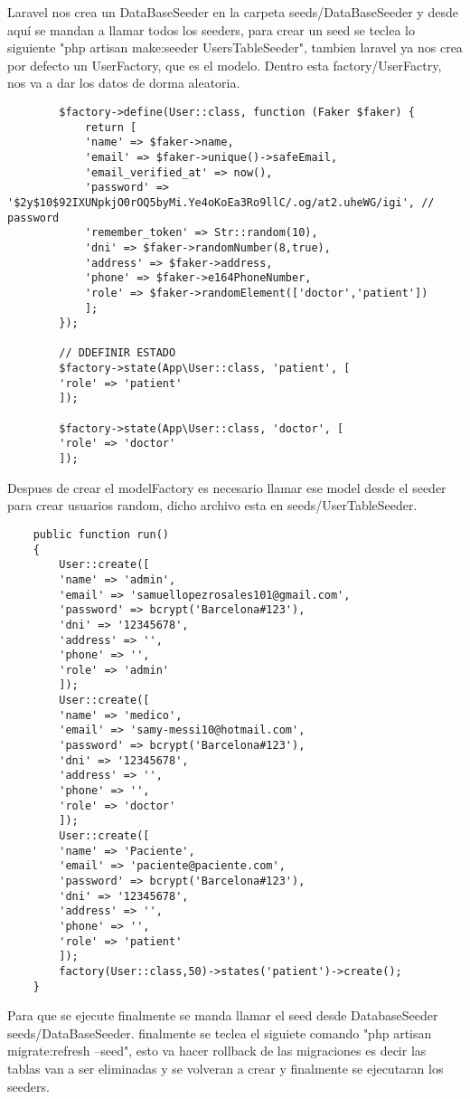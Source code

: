 \documentclass[a4paper]{article}
\begin{document}
	Laravel nos crea un DataBaseSeeder en la carpeta seeds/DataBaseSeeder y desde aquí se mandan a llamar todos los seeders, para crear un seed se teclea lo siguiente "php artisan make:seeder UsersTableSeeder", tambien laravel ya nos crea por defecto un UserFactory, que es el modelo. Dentro esta factory/UserFactry, nos va a dar los datos de dorma aleatoria.
	
	\begin{lstlisting}
		$factory->define(User::class, function (Faker $faker) {
			return [
			'name' => $faker->name,
			'email' => $faker->unique()->safeEmail,
			'email_verified_at' => now(),
			'password' => '$2y$10$92IXUNpkjO0rOQ5byMi.Ye4oKoEa3Ro9llC/.og/at2.uheWG/igi', // password
			'remember_token' => Str::random(10),
			'dni' => $faker->randomNumber(8,true),
			'address' => $faker->address,
			'phone' => $faker->e164PhoneNumber,
			'role' => $faker->randomElement(['doctor','patient'])
			];
		});
		
		// DDEFINIR ESTADO
		$factory->state(App\User::class, 'patient', [
		'role' => 'patient'
		]);
		
		$factory->state(App\User::class, 'doctor', [
		'role' => 'doctor'
		]);
	\end{lstlisting} 

	Despues de crear el modelFactory es necesario llamar ese model desde el seeder para crear usuarios random, dicho archivo esta en seeds/UserTableSeeder.
	
	\begin{lstlisting}
	public function run()
	{
		User::create([
		'name' => 'admin',
		'email' => 'samuellopezrosales101@gmail.com',
		'password' => bcrypt('Barcelona#123'),
		'dni' => '12345678',
		'address' => '',
		'phone' => '',
		'role' => 'admin'
		]);
		User::create([
		'name' => 'medico',
		'email' => 'samy-messi10@hotmail.com',
		'password' => bcrypt('Barcelona#123'),
		'dni' => '12345678',
		'address' => '',
		'phone' => '',
		'role' => 'doctor'
		]);
		User::create([
		'name' => 'Paciente',
		'email' => 'paciente@paciente.com',
		'password' => bcrypt('Barcelona#123'),
		'dni' => '12345678',
		'address' => '',
		'phone' => '',
		'role' => 'patient'
		]);
		factory(User::class,50)->states('patient')->create();
	}
	\end{lstlisting} 

	Para que se ejecute finalmente se manda llamar el seed desde DatabaseSeeder seeds/DataBaseSeeder. finalmente se teclea el siguiete comando "php artisan migrate:refresh --seed", esto va hacer rollback de las migraciones es decir las tablas van a ser eliminadas y se volveran a crear y finalmente se ejecutaran los seeders.
	
\end{document}
